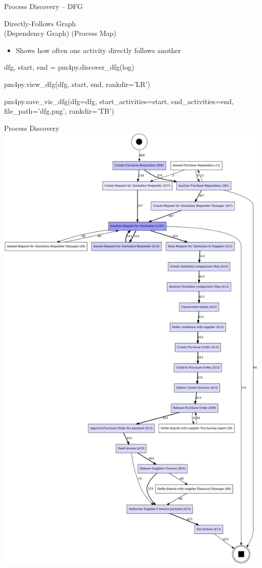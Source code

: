 \documentclass[ignorenonframetext,xcolor=x11names]{beamer}
\begin{document}
\begin{frame}[fragile]{Process Discovery -- DFG}
\begin{block}{Directly-Follows Graph \\ (Dependency Graph) (Process Map)}
\begin{itemize}
   \item Shows how often one activity directly follows another
\end{itemize}
\end{block}
\footnotesize
\begin{pythoncode}
dfg, start, end = pm4py.discover_dfg(log)

pm4py.view_dfg(dfg, start, end, rankdir='LR')

pm4py.save_vis_dfg(dfg=dfg,
    start_activities=start, 
    end_activities=end, 
    file_path='dfg.png', rankdir='TB')
\end{pythoncode}
\end{frame}

\begin{frame}{Process Discovery}
\centering
\includegraphics[width=\textwidth]{dfg.png}
\end{frame}
\end{document}
